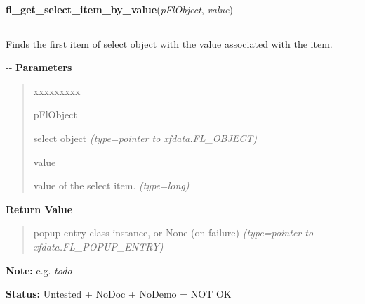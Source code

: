 \hspace{.8\funcindent}\begin{boxedminipage}{\funcwidth}

    \raggedright \textbf{fl\_get\_select\_item\_by\_value}(\textit{pFlObject}, \textit{value})

    \vspace{-1.5ex}

    \rule{\textwidth}{0.5\fboxrule}
\setlength{\parskip}{2ex}

Finds the first item of select object with the value associated with
the item.

-{}-
\setlength{\parskip}{1ex}
      \textbf{Parameters}
      \vspace{-1ex}

      \begin{quote}
        \begin{Ventry}{xxxxxxxxx}

          \item[pFlObject]


select object
            {\it (type=pointer to xfdata.FL\_OBJECT)}

          \item[value]


value of the select item.
            {\it (type=long)}

        \end{Ventry}

      \end{quote}

      \textbf{Return Value}
    \vspace{-1ex}

      \begin{quote}

popup entry class instance, or None (on failure)
      {\it (type=pointer to xfdata.FL\_POPUP\_ENTRY)}

      \end{quote}

\textbf{Note:} 
e.g. \emph{todo}


\textbf{Status:} 
Untested + NoDoc + NoDemo = NOT OK


    \end{boxedminipage}

    \label{xformslib:flselect:fl_get_select_item_by_label}

    \vspace{0.5ex}

